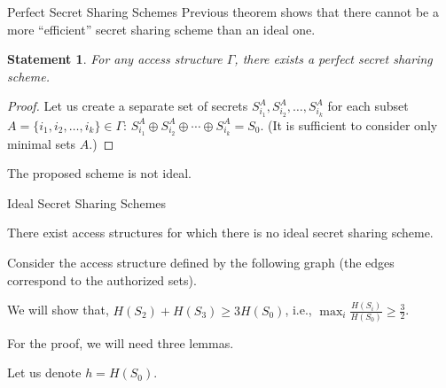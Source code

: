 \documentclass[
handout,
aspectratio=169]{beamer}
\newtheorem{statement}{Statement}
\newcommand{\seqn}[2]{{#1}_1,{#1}_2,\dotsc,{#1}_{#2}}
\begin{document}
\begin{frame}{Perfect Secret Sharing Schemes}
        Previous theorem shows that there cannot be a more ``efficient'' secret sharing scheme than an ideal one.

    \begin{statement}
        For any access structure $\Gamma$, there exists a perfect secret sharing scheme.
    \end{statement}

    \begin{proof}
        Let us create a separate set of secrets $S^A_{i_1}, S^A_{i_2}, \dotsc, S^A_{i_k}$ for each subset
        $A = \{\seqn{i}{k}\} \in \Gamma$: $S^A_{i_1} \oplus S^A_{i_2} \oplus \dotsb \oplus S^A_{i_k} = S_0$.
        (It is sufficient to consider only minimal sets $A$.)
    \end{proof}

        The proposed scheme is not ideal.


\end{frame}

\begin{frame}{Ideal Secret Sharing Schemes}
    \begin{theorem}
        There exist access structures for which there is no ideal secret sharing scheme.
    \end{theorem}

    Consider the access structure defined by the following graph (the edges correspond to the authorized
    sets).
    \begin{center}
    \end{center}
    We will show that, $H(S_2) + H(S_3) \ge 3H(S_0)$, i.e.,
    $\max_i \frac{H(S_i)}{H(S_0)} \ge \frac{3}{2}$.

    For the proof, we will need three lemmas.

    Let us denote $h = H(S_0)$.
\end{frame}
\end{document}
